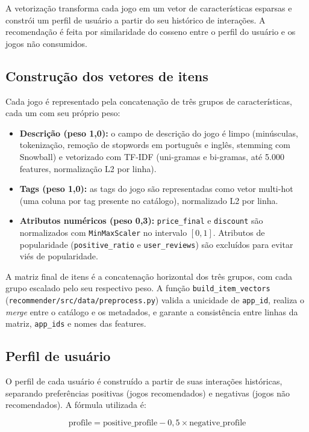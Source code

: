 \documentclass[12pt,a4paper]{article}
\begin{document}
A vetorização transforma cada jogo em um vetor de características esparsas e constrói um perfil de usuário a partir do seu histórico de interações. A recomendação é feita por similaridade do cosseno entre o perfil do usuário e os jogos não consumidos.

\subsection{Construção dos vetores de itens}

Cada jogo é representado pela concatenação de três grupos de características, cada um com seu próprio peso:

\begin{itemize}
    \item \textbf{Descrição (peso 1,0):} o campo de descrição do jogo é limpo (minúsculas, tokenização, remoção de stopwords em português e inglês, stemming com Snowball) e vetorizado com TF-IDF (uni-gramas e bi-gramas, até 5.000 features, normalização L2 por linha).
    \item \textbf{Tags (peso 1,0):} as tags do jogo são representadas como vetor multi-hot (uma coluna por tag presente no catálogo), normalizado L2 por linha.
    \item \textbf{Atributos numéricos (peso 0,3):} \texttt{price\_final} e \texttt{discount} são normalizados com \texttt{MinMaxScaler} no intervalo $[0,1]$. Atributos de popularidade (\texttt{positive\_ratio} e \texttt{user\_reviews}) são excluídos para evitar viés de popularidade.
\end{itemize}

A matriz final de itens é a concatenação horizontal dos três grupos, com cada grupo escalado pelo seu respectivo peso. A função \texttt{build\_item\_vectors} (\texttt{recommender/src/data/preprocess.py}) valida a unicidade de \texttt{app\_id}, realiza o \emph{merge} entre o catálogo e os metadados, e garante a consistência entre linhas da matriz, \texttt{app\_ids} e nomes das features.

\subsection{Perfil de usuário}

O perfil de cada usuário é construído a partir de suas interações históricas, separando preferências positivas (jogos recomendados) e negativas (jogos não recomendados). A fórmula utilizada é:

\begin{equation}
    \text{profile} = \text{positive\_profile} - 0,5 \times \text{negative\_profile}
\end{equation}
\end{document}
